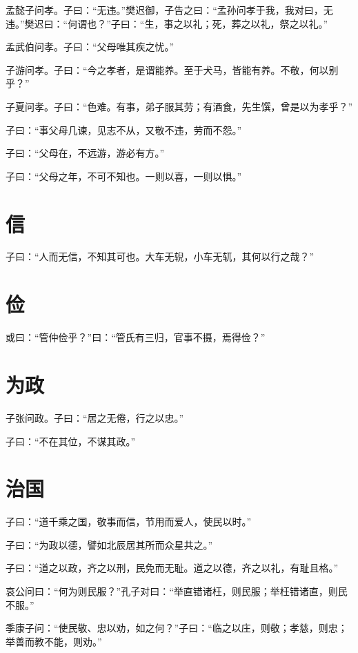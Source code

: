 \documentclass[a5paper]{ctexbook}
\begin{document}
    孟懿子问孝。子曰：“无违。”樊迟御，子告之曰：“孟孙问孝于我，我对曰，无违。”樊迟曰：“何谓也？”子曰：“生，事之以礼；死，葬之以礼，祭之以礼。”

    孟武伯问孝。子曰：“父母唯其疾之忧。”

    子游问孝。子曰：“今之孝者，是谓能养。至于犬马，皆能有养。不敬，何以别乎？”

    子夏问孝。子曰：“色难。有事，弟子服其劳；有酒食，先生馔，曾是以为孝乎？”

    子曰：“事父母几谏，见志不从，又敬不违，劳而不怨。”

    子曰：“父母在，不远游，游必有方。”

    子曰：“父母之年，不可不知也。一则以喜，一则以惧。”

    

    \chapter{信}

    子曰：“人而无信，不知其可也。大车无𫐐，小车无𫐄，其何以行之哉？”

    \chapter{俭}

    或曰：“管仲俭乎？”曰：“管氏有三归，官事不摄，焉得俭？”

    \chapter{为政}

    子张问政。子曰：“居之无倦，行之以忠。”

    子曰：“不在其位，不谋其政。”

    \chapter{治国}

    子曰：“道千乘之国，敬事而信，节用而爱人，使民以时。”

    子曰：“为政以德，譬如北辰居其所而众星共之。”

    子曰：“道之以政，齐之以刑，民免而无耻。道之以德，齐之以礼，有耻且格。”

    哀公问曰：“何为则民服？”孔子对曰：“举直错诸枉，则民服；举枉错诸直，则民不服。”

    季康子问：“使民敬、忠以劝，如之何？”子曰：“临之以庄，则敬；孝慈，则忠；举善而教不能，则劝。”
\end{document}
